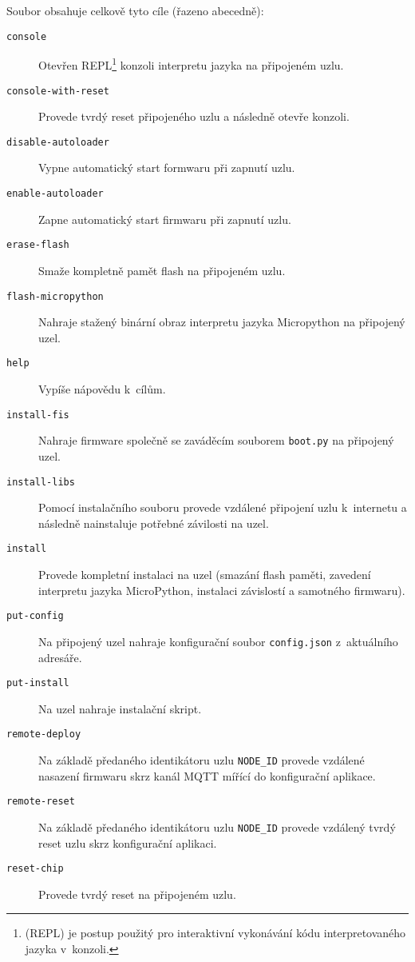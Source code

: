 Soubor  obsahuje celkově tyto cíle (řazeno abecedně):
\begin{description}
    \item[\texttt{console}] Otevřen REPL\footnote{ (REPL) je postup použitý pro
    interaktivní vykonávání kódu interpretovaného jazyka v~konzoli.} konzoli interpretu jazyka na připojeném uzlu.
    \item[\texttt{console-with-reset}] Provede tvrdý reset připojeného uzlu a následně otevře konzoli.
    \item[\texttt{disable-autoloader}] Vypne automatický start formwaru při zapnutí uzlu.
    \item[\texttt{enable-autoloader}] Zapne automatický start firmwaru při zapnutí uzlu.
    \item[\texttt{erase-flash}] Smaže kompletně pamět flash na připojeném uzlu.
    \item[\texttt{flash-micropython}] Nahraje stažený binární obraz interpretu jazyka Micropython na připojený uzel.
    \item[\texttt{help}] Vypíše nápovědu k~cílům.
    \item[\texttt{install-fis}] Nahraje firmware společně se zaváděcím souborem \texttt{boot.py} na připojený uzel.
    \item[\texttt{install-libs}] Pomocí instalačního souboru provede vzdálené připojení uzlu k~internetu a následně
    nainstaluje potřebné závilosti na uzel.
    \item[\texttt{install}] Provede kompletní instalaci na uzel (smazání flash paměti, zavedení interpretu jazyka
    MicroPython, instalaci závislostí a samotného firmwaru).
    \item[\texttt{put-config}] Na připojený uzel nahraje konfigurační soubor \texttt{config.json} z~aktuálního adresáře.
    \item[\texttt{put-install}] Na uzel nahraje instalační skript.
    \item[\texttt{remote-deploy}] Na základě předaného identikátoru uzlu \texttt{NODE\_ID} provede vzdálené nasazení
    firmwaru skrz kanál MQTT mířící do konfigurační aplikace.
    \item[\texttt{remote-reset}] Na základě předaného identikátoru uzlu \texttt{NODE\_ID} provede vzdálený tvrdý
    reset uzlu skrz konfigurační aplikaci.
    \item[\texttt{reset-chip}] Provede tvrdý reset na připojeném uzlu.
\end{description}
